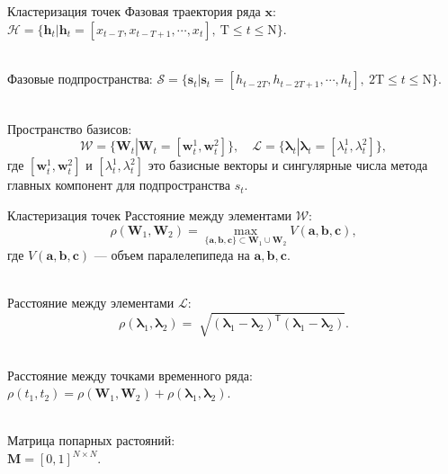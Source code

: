 \documentclass{beamer}
\begin{document}
\begin{frame}{Кластеризация точек}
Фазовая траектория ряда $\textbf{x}$:
$\mathcal{H} = \{\textbf{h}_t| \textbf{h}_t = [x_{t-T}, x_{t-T+1}, \cdots, x_{t}],~\text{T}\leq t\leq \text{N}\}.$

~\\
Фазовые подпространства:
$\mathcal{S} = \{\textbf{s}_t| \textbf{s}_t = [h_{t-2T}, h_{t-2T+1}, \cdots, h_{t}],~\text{2T}\leq t\leq \text{N}\}.$

~\\
Пространство базисов:
$$\mathcal{W} = \{\textbf{W}_{t}| \textbf{W}_t = [\textbf{w}^1_t, \textbf{w}^2_t]\}, \quad \mathcal{L} = \{\bm{\lambda}_t| \bm{\lambda}_t=[\lambda^1_t, \lambda^2_t]\}, $$
где $[\textbf{w}^1_t, \textbf{w}^2_t]$ и $[\lambda^1_t, \lambda^2_t]$ это базисные векторы и сингулярные числа метода главных компонент для подпространства $s_t$.
\end{frame}
\begin{frame}{Кластеризация точек}
Расстояние между элементами $\mathcal{W}$:\\
$$\rho\left(\textbf{W}_1, \textbf{W}_2\right) = \max_{\{\textbf{a},\textbf{b},\textbf{c}\} \subset \textbf{W}_1\cup \textbf{W}_2 } V\left(\textbf{a},\textbf{b},\textbf{c}\right),$$
где $V\left(\textbf{a},\textbf{b},\textbf{c}\right)$ --- объем паралелепипеда на $\textbf{a}, \textbf{b}, \textbf{c}$.

~\\
Расстояние между элементами $\mathcal{L}$:\\
$$\rho\left(\bm{\lambda}_1, \bm{\lambda}_2\right) = \sqrt[]{\left(\bm{\lambda}_1 - \bm{\lambda}_2\right)^{\mathsf{T}}\left(\bm{\lambda}_1 - \bm{\lambda}_2\right)}.$$

~\\
Расстояние между точками временного ряда:\\
$\rho\left(t_1, t_2\right) = \rho\left(\textbf{W}_1, \textbf{W}_2\right) + \rho\left(\bm{\lambda}_1, \bm{\lambda}_2\right).$

~\\
Матрица попарных растояний:\\
$\textbf{M} = [0, 1]^{N\times N}.$

\end{frame}
\end{document}
